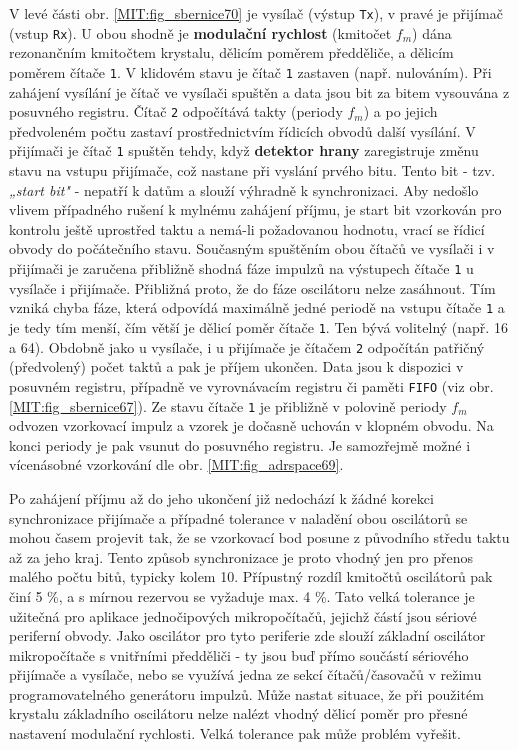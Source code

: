         V levé části obr. \ref{MIT:fig_sbernice70} je vysílač (výstup \texttt{Tx}), v pravé je 
        přijímač (vstup \texttt{Rx}). U obou shodně je \textbf{modulační rychlost} (kmitočet 
        \(f_m\)) dána rezonančním kmitočtem krystalu, dělicím poměrem předděliče, a dělicím poměrem 
        čítače \texttt{1}. V klidovém stavu je čítač \texttt{1} zastaven (např. nulováním). Při 
        zahájení vysílání je čítač ve vysílači spuštěn a data jsou bit za bitem vysouvána z 
        posuvného registru. Čítač \texttt{2} odpočítává takty (periody \(f_m\)) a po jejich 
        předvoleném počtu zastaví prostřednictvím řídicích obvodů další vysílání. V přijímači je 
        čítač \texttt{1} spuštěn tehdy, když \textbf{detektor hrany} zaregistruje změnu stavu na 
        vstupu přijímače, což nastane při vyslání prvého bitu. Tento bit - tzv. \emph{„start bit"} 
        - nepatří k datům a slouží výhradně k synchronizaci. Aby nedošlo vlivem případného rušení k 
        mylnému zahájení příjmu, je start bit vzorkován pro kontrolu ještě uprostřed taktu a 
        nemá-li požadovanou hodnotu, vrací se řídicí obvody do počátečního stavu. Současným 
        spuštěním obou čítačů ve vysílači i v přijímači je zaručena přibližně shodná fáze impulzů 
        na výstupech čítače \texttt{1} u vysílače i přijímače. Přibližná proto, že do fáze 
        oscilátoru nelze zasáhnout. Tím vzniká chyba fáze, která odpovídá maximálně jedné periodě 
        na vstupu čítače \texttt{1} a je tedy tím menší, čím větší je dělicí poměr čítače 
        \texttt{1}. Ten bývá volitelný (např. 16 a 64). Obdobně jako u vysílače, i u přijímače 
        je čítačem \texttt{2} odpočítán patřičný (předvolený) počet taktů a pak je příjem ukončen. 
        Data jsou k dispozici v posuvném registru, případně ve vyrovnávacím registru či paměti 
        \texttt{FIFO} (viz obr. \ref{MIT:fig_sbernice67}). Ze stavu čítače \texttt{1} je přibližně 
        v polovině periody \(f_m\) odvozen vzorkovací impulz a vzorek je dočasně uchován v klopném 
        obvodu. Na konci periody je pak vsunut do posuvného registru. Je samozřejmě možné i 
        vícenásobné vzorkování dle obr. \ref{MIT:fig_adrspace69}.
        
        Po zahájení příjmu až do jeho ukončení již nedochází k žádné korekci synchronizace 
        přijímače a případné tolerance v naladění obou oscilátorů se mohou časem projevit tak, že 
        se vzorkovací bod posune z původního středu taktu až za jeho kraj. Tento způsob 
        synchronizace je proto vhodný jen pro přenos malého počtu bitů, typicky kolem 10. Přípustný 
        rozdíl kmitočtů oscilátorů pak činí 5 \%, a s mírnou rezervou se vyžaduje max. 4 \%. Tato 
        velká tolerance je užitečná pro aplikace jednočipových mikropočítačů, jejichž částí jsou 
        sériové periferní obvody. Jako oscilátor pro tyto periferie zde slouží základní oscilátor 
        mikropočítače s vnitřními předděliči - ty jsou buď přímo součástí sériového        
        přijímače a vysílače, nebo se využívá jedna ze sekcí čítačů/časovačů v režimu 
        programovatelného generátoru impulzů. Může nastat situace, že při použitém krystalu 
        základního oscilátoru nelze nalézt vhodný dělicí poměr pro přesné nastavení modulační 
        rychlosti. Velká tolerance pak může problém vyřešit.
               
